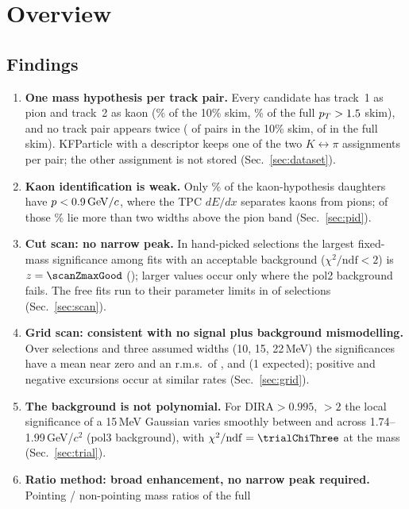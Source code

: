 \section{Overview}
\label{sec:overview}

\subsection*{Findings}
\begin{enumerate}
\item \textbf{One mass hypothesis per track pair.} Every candidate has track~1 as pion and track~2 as kaon
  (\hypFracTen\% of the 10\% skim, \hypFracFull\% of the full $p_T>1.5$ skim), and no track pair appears twice
  (\multiTen{} of \pairsTen{} pairs in the 10\% skim, \multiFull{} of \pairsFull{} in the full skim). KFParticle with a
   descriptor keeps one of the two $K\leftrightarrow\pi$ assignments per pair; the other assignment is not
  stored (Sec.~\ref{sec:dataset}).
\item \textbf{Kaon identification is weak.} Only \kLowFrac\% of the kaon-hypothesis daughters have $p<0.9\,\mathrm{GeV}/c$, where the
  TPC $dE/dx$ separates kaons from pions; of those \kLowAbove\% lie more than two widths above the pion band
  (Sec.~\ref{sec:pid}).
\item \textbf{Cut scan: no narrow peak.} In \scanN{} hand-picked selections the largest fixed-mass significance among
  fits with an acceptable background ($\chi^2/\mathrm{ndf}<2$) is $z=\scanZmaxGood$ (\scanZmaxGoodSel); larger values
  occur only where the pol2 background fails. The free fits run to their parameter limits in \scanFreeLim{} of \scanN{}
  selections (Sec.~\ref{sec:scan}).
\item \textbf{Grid scan: consistent with no signal plus background mismodelling.} Over \gridN{} selections and three
  assumed widths (10, 15, 22\,MeV) the significances have a mean near zero and an r.m.s.\ of \gridRmsTen, \gridRmsFifteen{}
  and \gridRmsTwentyTwo{} (1 expected); positive and negative excursions occur at similar rates (Sec.~\ref{sec:grid}).
\item \textbf{The background is not polynomial.} For DIRA$>0.995$, \Ls$>2$ the local significance of a 15\,MeV Gaussian
  varies smoothly between \trialZminThree{} and \trialZmaxThree{} across 1.74--1.99\,GeV/$c^2$ (pol3 background), with
  $\chi^2/\mathrm{ndf}=\trialChiThree$ at the \Dzero{} mass (Sec.~\ref{sec:trial}).
\item \textbf{Ratio method: broad enhancement, no narrow peak required.} Pointing / non-pointing mass ratios of the full

\end{enumerate}
